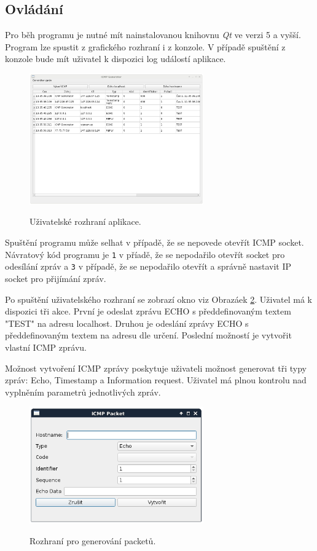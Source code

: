 \documentclass[12pt, a4paper]{article}
\begin{document}
\subsection{Ovládání}

Pro běh programu je nutné mít nainstalovanou knihovnu \emph{Qt} ve verzi 5 a vyšší. Program lze spustit z grafického rozhraní i z konzole. V případě spuštění z konzole bude mít uživatel k dispozici log událostí aplikace.

\begin{figure}[h!]
\centering
\includegraphics[bb= 0 0 820 445 , width=75mm]{gui.png}
\label{gui}
\caption{Uživatelské rozhraní aplikace.}
\end{figure}

Spuštění programu může selhat v případě, že se nepovede otevřít ICMP socket. Návratový kód programu je \texttt{1} v příadě, že se nepodařilo otevřít socket pro odesílání zpráv a \texttt{3} v případě, že se nepodařilo otevřít a správně nastavit IP socket pro přijímání zpráv.

Po spuštění uživatelského rozhraní se zobrazí okno viz Obrazáek \ref{gui}. Uživatel má k dispozici tři akce. První je odeslat zprávu ECHO s předdefinovaným textem "TEST" na adresu localhost. Druhou je odeslání zprávy ECHO s předdefinovaným textem na adresu dle určení. Poslední možností je vytvořit vlastní ICMP zprávu.

Možnost vytvoření ICMP zprávy poskytuje uživateli možnost generovat tři typy zpráv: Echo, Timestamp a Information request. Uživatel má plnou kontrolu nad vyplněním parametrů jednotlivých zpráv.

\begin{figure}[h!]
\centering
\includegraphics[bb= 0 0 820 445 , width=75mm]{gui2.png}
\label{gui}
\caption{Rozhraní pro generování packetů.}
\end{figure}
\end{document}
